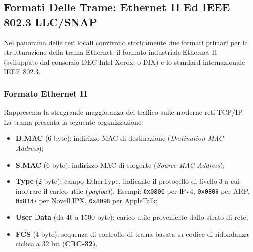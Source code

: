 \documentclass[11pt, a4paper]{article}
\begin{document}
\subsection{Formati Delle Trame: Ethernet II Ed IEEE 802.3 LLC/SNAP}

Nel panorama delle reti locali convivono storicamente due formati primari per la strutturazione della trama Ethernet: il formato industriale Ethernet II (sviluppato dal consorzio DEC-Intel-Xerox, o DIX) e lo standard internazionale IEEE 802.3.


\subsubsection{Formato Ethernet II}
Rappresenta la stragrande maggioranza del traffico sulle moderne reti TCP/IP. La trama presenta la seguente organizzazione:
\begin{itemize}[noitemsep]
    \item \textbf{D.MAC} (6 byte): indirizzo MAC di destinazione (\emph{Destination MAC Address});
    \item \textbf{S.MAC} (6 byte): indirizzo MAC di sorgente (\emph{Source MAC Address});
    \item \textbf{Type} (2 byte): campo EtherType, indicante il protocollo di livello 3 a cui inoltrare il carico utile (\emph{payload}). Esempi: \texttt{0x0800} per IPv4, \texttt{0x0806} per ARP, \texttt{0x8137} per Novell IPX, \texttt{0x809B} per AppleTalk;
    \item \textbf{User Data} (da 46 a 1500 byte): carico utile proveniente dallo strato di rete;
    \item \textbf{FCS} (4 byte): sequenza di controllo di trama basata su codice di ridondanza ciclica a 32 bit (\textbf{CRC-32}).
\end{itemize}
\end{document}
